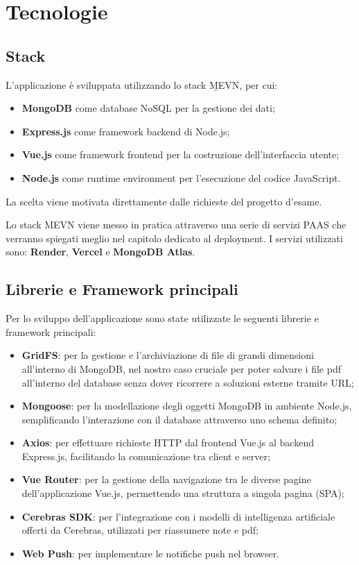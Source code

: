 \chapter{Tecnologie}
\section{Stack}
L'applicazione è sviluppata utilizzando lo stack \b{MEVN}, per cui:
\begin{itemize}
    \item \textbf{MongoDB} come database NoSQL per la gestione dei dati;
    \item \textbf{Express.js} come framework backend di Node.js;
    \item \textbf{Vue.js} come framework frontend per la costruzione dell'interfaccia utente;
    \item \textbf{Node.js} come runtime environment per l'esecuzione del codice JavaScript.
\end{itemize}
La scelta viene motivata direttamente dalle richieste del progetto d'esame.

Lo stack MEVN viene messo in pratica attraverso una serie di servizi PAAS che verranno spiegati meglio nel capitolo dedicato al deployment. I servizi utilizzati sono: \textbf{Render}, \textbf{Vercel} e \textbf{MongoDB Atlas}.

\section{Librerie e Framework principali}
Per lo sviluppo dell'applicazione sono state utilizzate le seguenti librerie e framework principali:
\begin{itemize}
    \item \textbf{GridFS}: per la gestione e l'archiviazione di file di grandi dimensioni all'interno di MongoDB, nel nostro caso cruciale per poter salvare i file pdf all'interno del database senza dover ricorrere a soluzioni esterne tramite URL;
    \item \textbf{Mongoose}: per la modellazione degli oggetti MongoDB in ambiente Node.js, semplificando l'interazione con il database attraverso uno schema definito;
    \item \textbf{Axios}: per effettuare richieste HTTP dal frontend Vue.js al backend Express.js, facilitando la comunicazione tra client e server;
    \item \textbf{Vue Router}: per la gestione della navigazione tra le diverse pagine dell'applicazione Vue.js, permettendo una struttura a singola pagina (SPA);
    \item \textbf{Cerebras SDK}: per l'integrazione con i modelli di intelligenza artificiale offerti da Cerebras, utilizzati per riassumere note e pdf;
    \item \textbf{Web Push}: per implementare le notifiche push nel browser.
\end{itemize}

